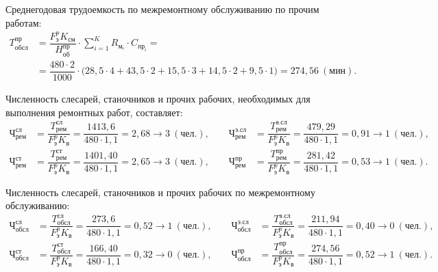 \vspace{-3mm}
Среднегодовая трудоемкость по межремонтному обслуживанию по
прочим работам:
{\small
\begin{align*}
  T^{\text{пр}}_{\text{обсл}} &= 
  \dfrac{
    F^p_{\text{э}} K_{см}
  }{
    H^{\text{пр}}_{\text{об}}
  } \cdot \sum^K_{i=1} R_{\text{м}_i} \cdot C_{\text{пр}_i} = \\
  &= \dfrac{480 \cdot 2}{1000}
    \cdot
    \big(
      28{,}5 \cdot 4 + 43{,}5 \cdot 2 + 15{,}5 \cdot 3 + 
      14{,}5 \cdot 2 + 9{,}5 \cdot 1
    \big) =
    274{,}56 \: (\text{мин}).
\end{align*}
}

Численность слесарей, станочников и прочих рабочих, необходимых
для выполнения ремонтных работ, составляет:
{\small
\begin{align*}
  \text{Ч}^{\text{сл}}_{\text{рем}} &= 
  \dfrac{
    T^{\text{сл}}_{\text{рем}}
  }{
    F^{p}_{\text{э}} K_{\text{в}}
  } =
  \dfrac{1413{,}6}{480 \cdot 1{,}1} = 
  2{,}68 \rightarrow 3 \: (\text{чел.}), 
  \qquad
  \text{Ч}^{\text{э.сл}}_{\text{рем}} &= 
  \dfrac{
    T^{\text{э.сл}}_{\text{рем}}
  }{
    F^{p}_{\text{э}} K_{\text{в}}
  } =
  \dfrac{479{,}29}{480 \cdot 1{,}1} = 
  0{,}91 \rightarrow 1 \: (\text{чел.}), 
  \\
  \text{Ч}^{\text{ст}}_{\text{рем}} &= 
  \dfrac{
    T^{\text{ст}}_{\text{рем}}
  }{
    F^{p}_{\text{э}} K_{\text{в}}
  } =
  \dfrac{1401{,}40}{480 \cdot 1{,}1} = 
  2{,}65 \rightarrow 3 \: (\text{чел.}), 
  \qquad
  \text{Ч}^{\text{пр}}_{\text{рем}} &= 
  \dfrac{
    T^{\text{пр}}_{\text{рем}}
  }{
    F^{p}_{\text{э}} K_{\text{в}}
  } =
  \dfrac{281{,}42}{480 \cdot 1{,}1} = 
  0{,}53 \rightarrow 1 \: (\text{чел.}). 
\end{align*}
}

\vspace{-3mm}
Численность слесарей, станочников и прочих рабочих
по межремонтному обслуживанию:
{\small
\begin{align*}
  \text{Ч}^{\text{сл}}_{\text{обсл}} &= 
  \dfrac{
    T^{\text{сл}}_{\text{обсл}}
  }{
    F^{p}_{\text{э}} K_{\text{в}}
  } =
  \dfrac{273{,}6}{480 \cdot 1{,}1} = 
  0{,}52 \rightarrow 1 \: (\text{чел.}), 
  \qquad
  \text{Ч}^{\text{э.сл}}_{\text{обсл}} &= 
  \dfrac{
    T^{\text{э.сл}}_{\text{обсл}}
  }{
    F^{p}_{\text{э}} K_{\text{в}}
  } =
  \dfrac{211{,}94}{480 \cdot 1{,}1} = 
  0{,}40 \rightarrow 0 \: (\text{чел.}), 
  \\
  \text{Ч}^{\text{ст}}_{\text{обсл}} &= 
  \dfrac{
    T^{\text{ст}}_{\text{обсл}}
  }{
    F^{p}_{\text{э}} K_{\text{в}}
  } =
  \dfrac{166{,}40}{480 \cdot 1{,}1} = 
  0{,}32 \rightarrow 0 \: (\text{чел.}), 
  \qquad
  \text{Ч}^{\text{пр}}_{\text{обсл}} &= 
  \dfrac{
    T^{\text{пр}}_{\text{обсл}}
  }{
    F^{p}_{\text{э}} K_{\text{в}}
  } =
  \dfrac{274{,}56}{480 \cdot 1{,}1} = 
  0{,}52 \rightarrow 1 \: (\text{чел.}). 
\end{align*}
}

